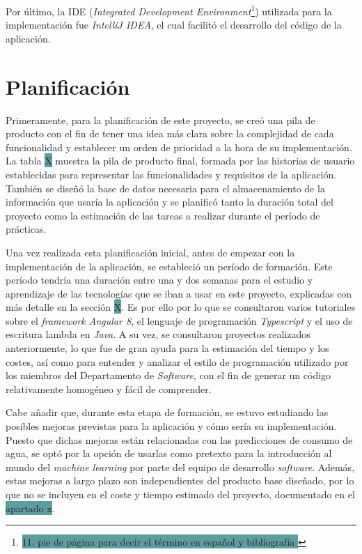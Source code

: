 \documentclass[pdftex,11pt,a4paper]{book}
\begin{document}
Por último, la IDE (\textit{Integrated Development Environment}\footnote{\colorbox{CadetBlue}{11. pie de página para decir el término en español y bibliografía \cite{bib:ide}} }) utilizada para la implementación fue \textit{IntelliJ IDEA}, el cual facilitó el desarrollo del código de la aplicación. 

\section{Planificación}

Primeramente, para la planificación de este proyecto, se creó una pila de producto con el fin de tener una idea más clara sobre la complejidad de cada funcionalidad y establecer un orden de prioridad a la hora de su implementación. La tabla \colorbox{CadetBlue}{ X} muestra la pila de producto final, formada por las historias de usuario establecidas para representar las funcionalidades y requisitos de la aplicación. También se diseñó la base de datos necesaria para el almacenamiento de la información que usaría la aplicación y se planificó tanto la duración total del proyecto como la estimación de las tareas a realizar durante el período de prácticas.

Una vez realizada esta planificación inicial, antes de empezar con la implementación de la aplicación, se estableció un período de formación. Este período tendría una duración entre una y dos semanas para el estudio y aprendizaje de las tecnologías que se iban a usar en este proyecto, explicadas con más detalle en la sección \colorbox{CadetBlue}{X}. Es por ello por lo que se consultaron varios tutoriales sobre el \textit{framework Angular 8}, el lenguaje de programación \textit{Typescript} y el uso de escritura lambda en \textit{Java}. A su vez, se consultaron proyectos realizados anteriormente, lo que fue de gran ayuda para la estimación del tiempo y los costes, así como para entender y analizar el estilo de programación utilizado por los miembros del Departamento de \textit{Software}, con el fin de generar un código relativamente homogéneo y fácil de comprender. 

Cabe añadir que, durante esta etapa de formación, se estuvo estudiando las posibles mejoras previstas para la aplicación y cómo sería su implementación. Puesto que dichas mejoras están relacionadas con las predicciones de consumo de agua, se optó por la opción de usarlas como pretexto para la introducción al mundo del \textit{machine learning} por parte del equipo de desarrollo \textit{software}. Además, estas mejoras a largo plazo son independientes del producto base diseñado, por lo que no se incluyen en el coste y tiempo estimado del proyecto, documentado en el \colorbox{CadetBlue}{apartado x}.
\end{document}
